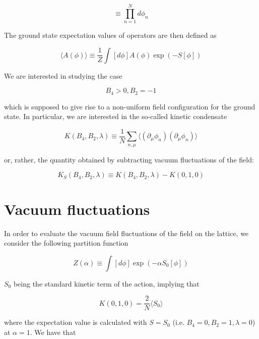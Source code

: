 \documentclass{article}
\begin{document}
\begin{equation}
[d\phi] \equiv \prod_{n=1}^N d\phi_n
\end{equation}

\noindent The ground state expectation values of operators are then defined as

\begin{equation}
\langle A(\phi) \rangle \equiv \frac{1}{Z} \int [d\phi] A(\phi) \exp\left( -S[\phi]\right)
\end{equation}

\noindent We are interested in studying the case

\begin{equation}
B_4 > 0, B_2 = -1
\end{equation}

\noindent which is supposed to give rise to a non-uniform field configuration for the ground state.
In particular, we are interested in the so-called kinetic condensate

\begin{equation}
K(B_4, B_2, \lambda) \equiv \frac{1}{N}\sum_{n, \mu} \langle (\partial_\mu \phi_n)(\partial_\mu \phi_n) \rangle
\end{equation}

\noindent or, rather, the quantity obtained by subtracting vacuum fluctuations of the field:

\begin{equation}
K_S(B_4, B_2, \lambda) \equiv K(B_4, B_2, \lambda) - K(0, 1, 0)
\end{equation}

\section{Vacuum fluctuations}

In order to evaluate the vacuum field fluctuations of the field on the lattice, we consider the following partition function

\begin{equation}
Z(\alpha) \equiv \int [d\phi] \exp(-\alpha S_0[\phi])
\end{equation}

\noindent $S_0$ being the standard kinetic term of the action, implying that

\begin{equation}
K(0,1,0) = \frac{2}{N} \langle S_0 \rangle
\end{equation}

\noindent where the expectation value is calculated with $S=S_0$ (i.e. $B_4=0, B_2=1, \lambda=0$) at $\alpha=1$. We have that
\end{document}
